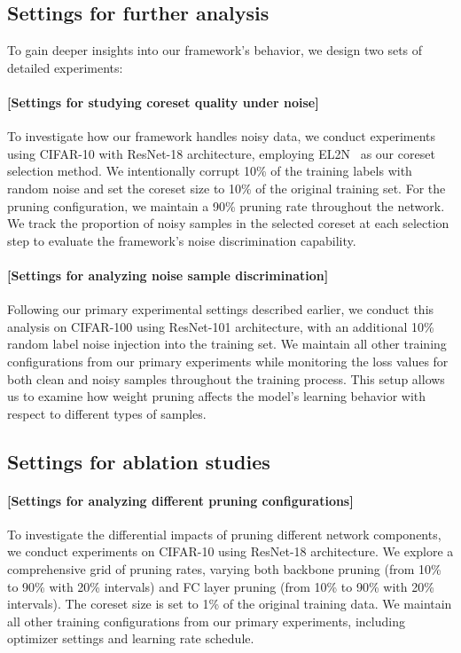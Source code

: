 \subsection{Settings for further analysis}
To gain deeper insights into our framework's behavior, we design two sets of detailed experiments:
\paragraph{[Settings for studying coreset quality under noise]}
To investigate how our framework handles noisy data, we conduct experiments using CIFAR-10 with ResNet-18 architecture, employing EL2N~\cite{paul2021deep} as our coreset selection method. We intentionally corrupt 10\% of the training labels with random noise and set the coreset size to 10\% of the original training set. For the pruning configuration, we maintain a 90\% pruning rate throughout the network. We track the proportion of noisy samples in the selected coreset at each selection step to evaluate the framework's noise discrimination capability.

\paragraph{[Settings for analyzing noise sample discrimination]}
Following our primary experimental settings described earlier, we conduct this analysis on CIFAR-100 using ResNet-101 architecture, with an additional 10\% random label noise injection into the training set. We maintain all other training configurations from our primary experiments while monitoring the loss values for both clean and noisy samples throughout the training process. This setup allows us to examine how weight pruning affects the model's learning behavior with respect to different types of samples.

\subsection{Settings for ablation studies}
\paragraph{[Settings for analyzing different pruning configurations]}
To investigate the differential impacts of pruning different network components, we conduct experiments on CIFAR-10 using ResNet-18 architecture. We explore a comprehensive grid of pruning rates, varying both backbone pruning (from 10\% to 90\% with 20\% intervals) and FC layer pruning (from 10\% to 90\% with 20\% intervals). The coreset size is set to 1\% of the original training data. We maintain all other training configurations from our primary experiments, including optimizer settings and learning rate schedule.

